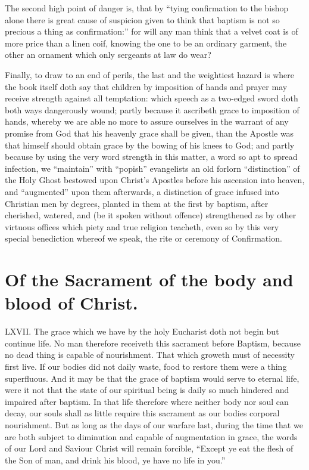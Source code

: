 The second high point of danger is, that by “tying confirmation to the bishop alone there is great cause of suspicion given to think that baptism is not so precious a thing as confirmation:” for will any man think that a velvet coat is of more price than a linen coif, knowing the one to be an ordinary garment, the other an ornament which only sergeants at law do wear?

Finally, to draw to an end of perils, the last and the weightiest hazard is where the book itself doth say that children by imposition of hands and prayer may receive strength against all temptation: which speech as a two-edged sword doth both ways dangerously wound; partly because it ascribeth grace to imposition of hands, whereby we are able no more to assure ourselves in the warrant of any promise from God that his heavenly grace shall be given, than the Apostle was that himself should obtain grace by the bowing of his knees to God; and partly because by using the very word strength in this matter, a word so apt to spread infection, we “maintain” with “popish” evangelists an old forlorn “distinction” of the Holy Ghost bestowed upon Christ’s Apostles before his ascension into heaven, and “augmented” upon them afterwards, a distinction of grace infused into Christian  men by degrees,
 planted in them at the first by baptism, after cherished, watered, and (be it spoken without offence) strengthened as by other virtuous offices which piety and true religion teacheth, even so by this very special benediction whereof we speak, the rite or ceremony of Confirmation.


\section*{Of the Sacrament of the body and blood of Christ.}
LXVII. The grace which we have by the holy Eucharist doth not begin but continue life. No man therefore receiveth this sacrament before Baptism, because no dead thing is capable of nourishment. That which groweth must of necessity first live. If our bodies did not daily waste, food to restore them were a thing superfluous. And it may be that the grace of baptism would serve to eternal life, were it not that the state of our spiritual being is daily so much hindered and impaired after baptism. In that life therefore where neither body nor soul can decay, our souls shall as little require this sacrament as our bodies corporal nourishment. But as long as the days of our warfare last, during the time that we are both subject to diminution and capable of augmentation in grace, the words of our Lord and Saviour Christ will remain forcible, “Except ye eat the flesh of the Son of man, and drink his blood, ye have no life in you.”

